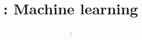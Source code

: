 \usepackage{../../beamerthemeFalmouthGamesAcademy}
\usepackage{multimedia}
\graphicspath{ {../../} }


\usepackage[normalem]{ulem}
\usepackage{wasysym}

\usepackage{pdfpages}

\usetikzlibrary{arrows,automata}




\title{\sessionnumber: Machine learning}
\subtitle{\modulecode: \moduletitle}

\frame{\titlepage} 







